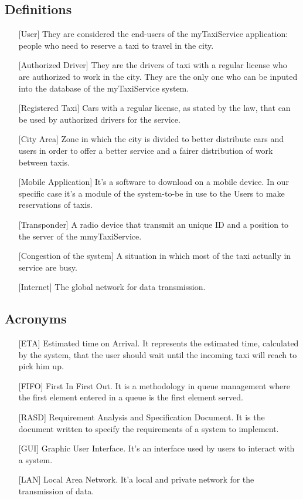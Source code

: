 \documentclass[12pt,a4paper]{book}
\begin{document}
			\subsection{Definitions}
				\begin{itemize}
					\item[\textbullet] [User] They are considered the end-users of the myTaxiService application: people who need to reserve a taxi to travel in the city.
					\item[\textbullet] [Authorized Driver] They are the drivers of taxi with a regular license who are authorized to work in the city. They are the only one who can be inputed into the database of the myTaxiService system.
					\item[\textbullet] [Registered Taxi] Cars with a regular license, as stated by the law, that can be used by authorized drivers for the service.
					\item[\textbullet] [City Area] Zone in which the city is divided to better distribute cars and users in order to offer a better service and a fairer distribution of work between taxis.
					\item[\textbullet] [Mobile Application] It's a software to download on a mobile device. In our specific case it's a module of the system-to-be in use to the Users to make reservations of taxis.
					\item[\textbullet] [Transponder] A radio device that transmit an unique ID and a position to the server of the mmyTaxiService.
					\item[\textbullet] [Congestion of the system] A situation in which most of the taxi actually in service are busy.
					\item[\textbullet] [Internet] The global network for data transmission.
				\end{itemize}
			\subsection{Acronyms}
				\begin{itemize}
					\item[\textbullet][ETA] Estimated time on Arrival. It represents the estimated time, calculated by the system, that the user should wait until the incoming taxi will reach to pick him up.
					\item[\textbullet][FIFO] First In First Out. It is a methodology in queue management where the first element entered in a queue is the first element served.
					\item[\textbullet][RASD] Requirement Analysis and Specification Document. It is the document written to specify the requirements of a system to implement.
					\item[\textbullet][GUI] Graphic User Interface. It's an interface used by users to interact with a system.
					\item[\textbullet][LAN] Local Area Network. It'a local and private network for the transmission of data.
				\end{itemize}
\end{document}
